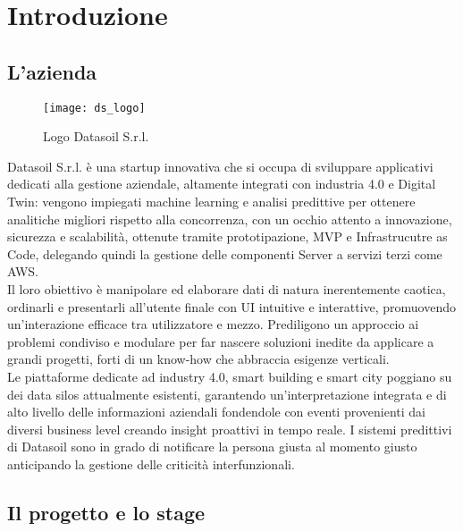 
\chapter{Introduzione}
\label{cap:introduzione}

\section{L'azienda}
\begin{figure}[ht]
    \centering
    \texttt{[image: ds\_logo]}
    \caption{Logo Datasoil S.r.l.}
\end{figure} 
\aCapo{}
Datasoil S.r.l. è una startup innovativa che si occupa di sviluppare applicativi dedicati alla gestione aziendale, altamente integrati con industria 4.0 e Digital Twin: vengono impiegati machine learning e analisi predittive per ottenere analitiche migliori rispetto alla concorrenza, con un occhio attento a innovazione, sicurezza e scalabilità, ottenute tramite prototipazione, MVP e Infrastrucutre as Code, delegando quindi la gestione delle componenti Server a servizi terzi come AWS.\\
Il loro obiettivo è manipolare ed elaborare dati di natura inerentemente caotica, ordinarli e presentarli all'utente finale con UI intuitive e interattive, promuovendo un'interazione efficace tra utilizzatore e mezzo. Prediligono un approccio ai problemi condiviso e modulare per far nascere soluzioni inedite da applicare a grandi progetti, forti di un know-how che abbraccia esigenze verticali.\\
Le piattaforme dedicate ad industry 4.0, smart building e smart city poggiano su dei data silos attualmente esistenti, garantendo un'interpretazione integrata e di alto livello delle informazioni aziendali fondendole con eventi provenienti dai diversi business level creando insight proattivi in tempo reale. I sistemi predittivi di Datasoil sono in grado di notificare la persona giusta al momento giusto anticipando la gestione delle criticità interfunzionali.

\section{Il progetto e lo stage}

